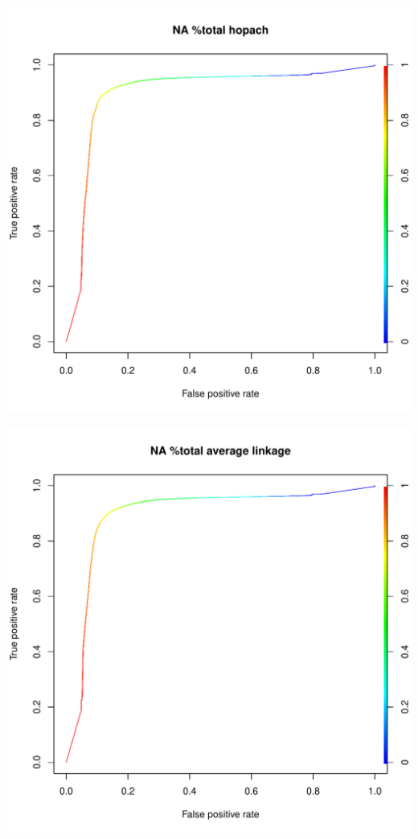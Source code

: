 \documentclass[11pt,a4paper,twoside]{report}\usepackage[]{graphicx}\usepackage[]{color}
\makeatletter
\def\maxwidth{ %
  \ifdim\Gin@nat@width>\linewidth
    \linewidth
  \else
    \Gin@nat@width
  \fi
}
\newenvironment{knitrout}{}{} %
\makeatother
\begin{document}
\begin{knitrout}
\includegraphics[width=\maxwidth]{figure/fig_code-13} 

\includegraphics[width=\maxwidth]{figure/fig_code-14} 


\end{knitrout}
\end{document}
